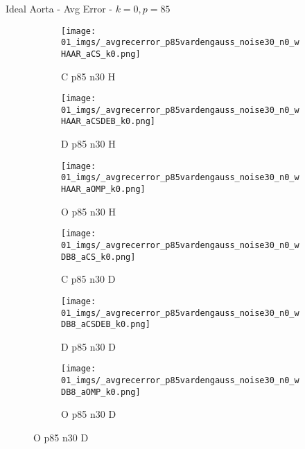 \begin{frame}{Ideal Aorta - Avg Error - $k=0,p=85$}{}
\begin{figure}
\begin{subfigure}{0.13\textwidth}
\texttt{[image: 01\_imgs/\_avgrecerror\_p85vardengauss\_noise30\_n0\_wHAAR\_aCS\_k0.png]}
\caption*{\tiny C p85 n30 H}
\end{subfigure}
\begin{subfigure}{0.13\textwidth}
\texttt{[image: 01\_imgs/\_avgrecerror\_p85vardengauss\_noise30\_n0\_wHAAR\_aCSDEB\_k0.png]}
\caption*{\tiny D p85 n30 H}
\end{subfigure}
\begin{subfigure}{0.13\textwidth}
\texttt{[image: 01\_imgs/\_avgrecerror\_p85vardengauss\_noise30\_n0\_wHAAR\_aOMP\_k0.png]}
\caption*{\tiny O p85 n30 H}
\end{subfigure}
\begin{subfigure}{0.13\textwidth}
\texttt{[image: 01\_imgs/\_avgrecerror\_p85vardengauss\_noise30\_n0\_wDB8\_aCS\_k0.png]}
\caption*{\tiny C p85 n30 D}
\end{subfigure}
\begin{subfigure}{0.13\textwidth}
\texttt{[image: 01\_imgs/\_avgrecerror\_p85vardengauss\_noise30\_n0\_wDB8\_aCSDEB\_k0.png]}
\caption*{\tiny D p85 n30 D}
\end{subfigure}
\begin{subfigure}{0.13\textwidth}
\texttt{[image: 01\_imgs/\_avgrecerror\_p85vardengauss\_noise30\_n0\_wDB8\_aOMP\_k0.png]}
\caption*{\tiny O p85 n30 D}
\end{subfigure}
\end{figure}
\end{frame}


